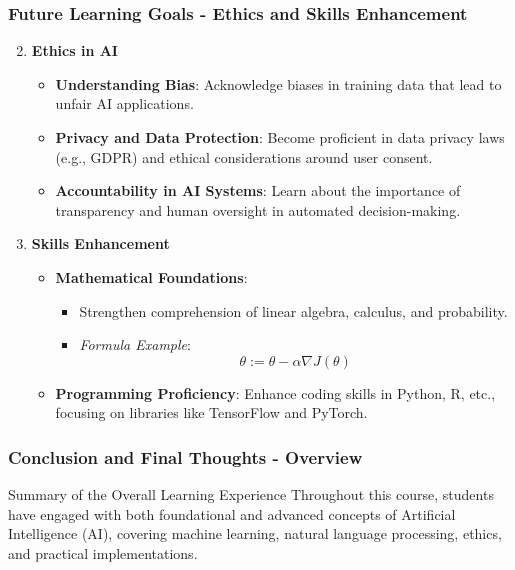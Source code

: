 \documentclass[aspectratio=169]{beamer}
\begin{document}
\begin{frame}[fragile]
    \frametitle{Future Learning Goals - Ethics and Skills Enhancement}
    \begin{enumerate}
        \setcounter{enumi}{1}
        \item \textbf{Ethics in AI}
        \begin{itemize}
            \item \textbf{Understanding Bias}: Acknowledge biases in training data that lead to unfair AI applications.
            \item \textbf{Privacy and Data Protection}: Become proficient in data privacy laws (e.g., GDPR) and ethical considerations around user consent.
            \item \textbf{Accountability in AI Systems}: Learn about the importance of transparency and human oversight in automated decision-making.
        \end{itemize}
        
        \item \textbf{Skills Enhancement}
        \begin{itemize}
            \item \textbf{Mathematical Foundations}: 
            \begin{itemize}
                \item Strengthen comprehension of linear algebra, calculus, and probability.
                \item \textit{Formula Example}:
                \begin{equation} 
                    \theta := \theta - \alpha \nabla J(\theta) 
                \end{equation}
            \end{itemize}
            \item \textbf{Programming Proficiency}: Enhance coding skills in Python, R, etc., focusing on libraries like TensorFlow and PyTorch.
        \end{itemize}
    \end{enumerate}
\end{frame}

\begin{frame}[fragile]
    \frametitle{Conclusion and Final Thoughts - Overview}
    \begin{block}{Summary of the Overall Learning Experience}
        Throughout this course, students have engaged with both foundational and advanced concepts of Artificial Intelligence (AI), covering machine learning, natural language processing, ethics, and practical implementations.
    \end{block}
\end{frame}
\end{document}
